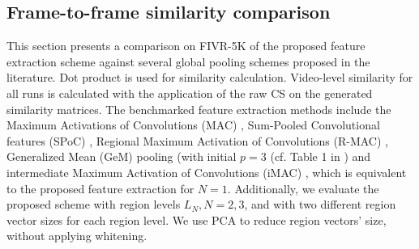 \documentclass[10pt,twocolumn,letterpaper]{article}
\begin{document}
\subsection{Frame-to-frame similarity comparison}
\label{sec:feature_comparison}
This section presents a comparison  on FIVR-5K of the proposed feature extraction scheme against several global pooling schemes proposed in the literature. Dot product is used for similarity calculation. 
Video-level similarity for all runs is calculated with the application of the raw CS on the generated similarity matrices. The benchmarked feature extraction methods include the Maximum Activations of Convolutions (MAC) \cite{tolias2015},  Sum-Pooled Convolutional features (SPoC) \cite{babenko2015}, Regional Maximum Activation of Convolutions (R-MAC) \cite{tolias2015}, Generalized Mean (GeM) pooling \cite{radenovic2018} (with initial $p=3$ (cf. Table 1 in \cite{radenovic2018}) and intermediate Maximum Activation of Convolutions (iMAC) \cite{kordopatis2017a}, which is equivalent to the proposed feature extraction for $N=1$. Additionally, we evaluate the proposed scheme with region levels $L_N, N=2,3$, and with two different region vector sizes for each region level. We use PCA to reduce region vectors' size, without applying whitening.
\end{document}
